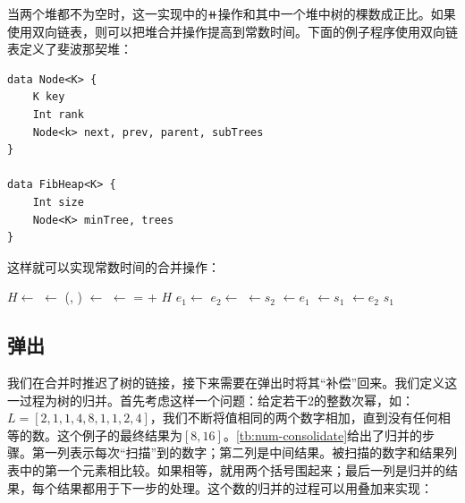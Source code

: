 \documentclass[b5paper]{ctexart}
\begin{document}
当两个堆都不为空时，这一实现中的$\doubleplus$操作和其中一个堆中树的棵数成正比。如果使用双向链表，则可以把堆合并操作提高到常数时间。下面的例子程序使用双向链表定义了斐波那契堆：

\begin{lstlisting}[language = Bourbaki]
data Node<K> {
    K key
    Int rank
    Node<k> next, prev, parent, subTrees
}

data FibHeap<K> {
    Int size
    Node<K> minTree, trees
}
\end{lstlisting}

这样就可以实现常数时间的合并操作：

\begin{algorithmic}[1]
  \State $H \gets$ 
  \State {} $\gets$ (, )
    \State {} $\gets$ 
  \Else
    \State {} $\gets$ 
  \EndIf
   =  + 
  \State \Return $H$
\EndFunction
\Statex
{}
  \State $e_1 \gets$ 
  \State $e_2 \gets$ 
  \State {} $\gets s_2$
  \State {} $\gets e_1$
  \State {} $\gets s_1$
  \State {} $\gets e_2$
  \State \Return $s_1$
\EndFunction
\end{algorithmic}

\subsection{弹出}
 

我们在合并时推迟了树的链接，接下来需要在弹出时将其“补偿”回来。我们定义这一过程为树的归并。首先考虑这样一个问题：给定若干2的整数次幂，如：$L = [2, 1, 1, 4, 8, 1, 1, 2, 4]$，我们不断将值相同的两个数字相加，直到没有任何相等的数。这个例子的最终结果为$[8, 16]$。\cref{tb:num-consolidate}给出了归并的步骤。第一列表示每次“扫描”到的数字；第二列是中间结果。被扫描的数字和结果列表中的第一个元素相比较。如果相等，就用两个括号围起来；最后一列是归并的结果，每个结果都用于下一步的处理。这个数的归并的过程可以用叠加来实现：
\end{document}
